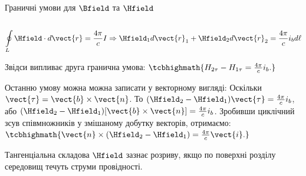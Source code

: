 \documentclass{beamer}
\begin{document}
\begin{frame}{Граничні умови для $\Bfield$ та $\Hfield$}{}
\begin{onlyenv}
\begin{columns}
			\begin{column}{0.4\linewidth}\centering
				
			\end{column}
		\end{columns}
		\begin{block}{}\scriptsize
			\begin{equation*}
				\oint\limits_L \Hfield\cdot d\vect{r} = \frac{4\pi}cI \Rightarrow \Hfield_1 d\vect{r}_1 +
				\Hfield_2 d\vect{r}_2 = \frac{4\pi}c i_b d\ell
			\end{equation*}
		\end{block}
		\begin{block}{}
			Звідси випливає друга гранична умова:
			\(
			\tcbhighmath{
				H_{2\tau} - H_{1\tau} = \frac{4\pi}c i_b.
			}
			\)
		\end{block}
		\begin{block}{}\justifying\scriptsize
			Останню умову можна можна записати у векторному вигляді: Оскільки $ \vect{\tau} = \vect{b}\times\vect{n} $. То $(\Hfield_2 - \Hfield_1)\vect{\tau} =
				\frac{4\pi}c i_b $, або $(\Hfield_2 - \Hfield_1)[\vect{b}\times\vect{n}] = \frac{4\pi}c i_b $. Зробивши циклічний зсув співмножників у змішаному
			добутку векторів, отримаємо:
			\(
				\tcbhighmath{
					\vect{n}\times (\Hfield_2 - \Hfield_1) = \frac{4\pi}c \vect{i}.
				}
			\)
		\end{block}
\begin{alertblock}{}\centering\scriptsize
    Тангенціальна складова $\Hfield$ зазнає розриву, якщо по поверхні розділу середовищ течуть \alert{струми провідності}.
\end{alertblock}
	\end{onlyenv}
\end{frame}
\end{document}
